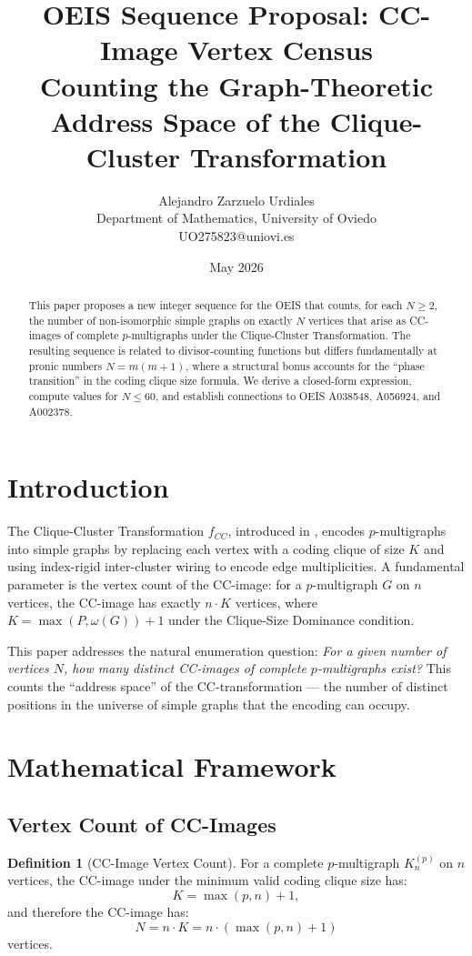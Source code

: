 \documentclass[11pt,a4paper]{article}
\title{OEIS Sequence Proposal: CC-Image Vertex Census\\
\large Counting the Graph-Theoretic Address Space of the Clique-Cluster Transformation}
\author{Alejandro Zarzuelo Urdiales\\
Department of Mathematics, University of Oviedo\\
UO275823@uniovi.es}
\date{May 2026}
\theoremstyle{definition}
\newtheorem{definition}{Definition}[section]
\begin{document}
\maketitle

\begin{abstract}
This paper proposes a new integer sequence for the OEIS that counts, for each $N \geq 2$, the number of non-isomorphic simple graphs on exactly $N$ vertices that arise as CC-images of complete $p$-multigraphs under the Clique-Cluster Transformation. The resulting sequence is related to divisor-counting functions but differs fundamentally at pronic numbers $N = m(m+1)$, where a structural bonus accounts for the ``phase transition'' in the coding clique size formula. We derive a closed-form expression, compute values for $N \leq 60$, and establish connections to OEIS A038548, A056924, and A002378.
\end{abstract}

\section{Introduction}

The Clique-Cluster Transformation $f_{CC}$, introduced in \cite{zarzuelo2025}, encodes $p$-multigraphs into simple graphs by replacing each vertex with a coding clique of size $K$ and using index-rigid inter-cluster wiring to encode edge multiplicities. A fundamental parameter is the vertex count of the CC-image: for a $p$-multigraph $G$ on $n$ vertices, the CC-image has exactly $n \cdot K$ vertices, where $K = \max(P, \omega(G)) + 1$ under the Clique-Size Dominance condition.

This paper addresses the natural enumeration question: \emph{For a given number of vertices $N$, how many distinct CC-images of complete $p$-multigraphs exist?} This counts the ``address space'' of the CC-transformation --- the number of distinct positions in the universe of simple graphs that the encoding can occupy.

\section{Mathematical Framework}

\subsection{Vertex Count of CC-Images}

\begin{definition}[CC-Image Vertex Count]
For a complete $p$-multigraph $K_n^{(p)}$ on $n$ vertices, the CC-image under the minimum valid coding clique size has:
\[
K = \max(p, n) + 1,
\]
and therefore the CC-image has:
\[
N = n \cdot K = n \cdot (\max(p, n) + 1)
\]
vertices.
\end{definition}
\end{document}
